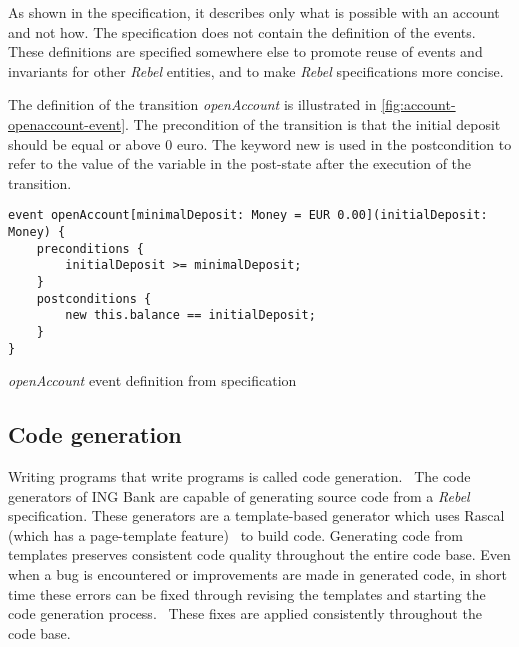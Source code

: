 As shown in the specification, it describes only what is possible with an
account and not how. The specification does not contain the definition of the
events. These definitions are specified somewhere else to promote reuse of
events and invariants for other \textit{Rebel} entities, and to make
\textit{Rebel} specifications more concise.~\cite[p.~4]{stoel_storm_vinju_bosman_2016}

The definition of the transition \textit{openAccount} is illustrated in
\autoref{fig:account-openaccount-event}. The precondition of the transition is
that the initial deposit should be equal or above 0 euro. The keyword new is
used in the postcondition to refer to the value of the variable in the
post-state after the execution of the transition.~\cite[p.~4]{stoel_storm_vinju_bosman_2016}

\begin{sourcecode}[h!]
\begin{lstlisting}[]
event openAccount[minimalDeposit: Money = EUR 0.00](initialDeposit: Money) {
	preconditions {
		initialDeposit >= minimalDeposit;
	}
	postconditions {
		new this.balance == initialDeposit;
	}
}
\end{lstlisting}
\caption{\textit{openAccount} event definition from specification}\label{fig:account-openaccount-event}
\end{sourcecode}
\FloatBarrier

\subsection{Code generation}\label{sec:ch2-codegen}

Writing programs that write programs is called code
generation.~\cite[p.~3]{herrington2003code} The code generators of ING Bank are
capable of generating source code from a \textit{Rebel} specification.
These generators are a template-based generator which uses Rascal (which has a
page-template feature)~\cite{RascalGTTSE} to build code.
Generating code from templates preserves consistent code quality throughout the
entire code base. Even when a bug is encountered or improvements are made in
generated code, in short time these errors can be fixed through revising the
templates and starting the code generation process.~\cite[p.~15-17]{herrington2003code}
These fixes are applied consistently throughout the code base.

